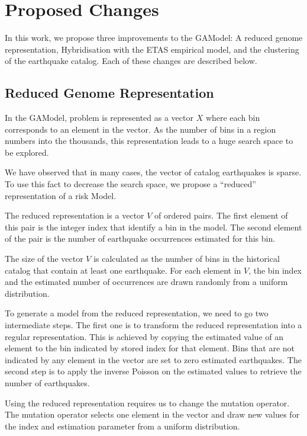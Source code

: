 \section{Proposed Changes}
\label{sec:adaptations}

In this work, we propose three improvements to the GAModel: A reduced
genome representation, Hybridisation with the ETAS empirical model,
and the clustering of the earthquake catalog. Each of these changes
are described below.

\subsection{Reduced Genome Representation}

In the GAModel, problem is represented as a vector $X$ where each bin
corresponds to an element in the vector. As the number of bins in a
region numbers into the thousands, this representation leads to a huge
search space to be explored.

We have observed that in many cases, the vector of catalog earthquakes
is sparse. To use this fact to decrease the search space, we propose a
``reduced'' representation of a risk Model.

The reduced representation is a vector $V$ of ordered pairs. The first
element of this pair is the integer index that identify a bin in the
model. The second element of the pair is the number of earthquake
occurrences estimated for this bin.

The size of the vector $V$ is calculated as the number of bins in the
historical catalog that contain at least one earthquake. For each
element in $V$, the bin index and the estimated number of occurrences
are drawn randomly from a uniform distribution.

To generate a model from the reduced representation, we need to go two
intermediate steps. The first one is to transform the reduced
representation into a regular representation. This is achieved by
copying the estimated value of an element to the bin indicated by
stored index for that element. Bins that are not indicated by any
element in the vector are set to zero estimated earthquakes. The
second step is to apply the inverse Poisson on the estimated values to
retrieve the number of earthquakes.

Using the reduced representation requires us to change the mutation
operator. The mutation operator selects one element in the vector and
draw new values for the index and estimation parameter from a uniform
distribution.


